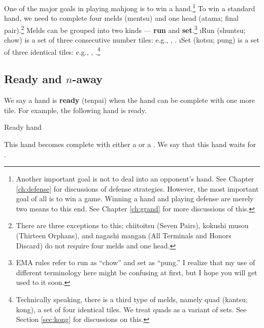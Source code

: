 One of the major goals in playing mahjong is to win a hand.\footnote{Another important goal is not to deal into an opponent's hand. See Chapter \ref{ch:defense} for discussions of defense strategies. However, the most important goal of all is to win a game. Winning a hand and playing defense are merely two means to this end. See Chapter \ref{ch:grand} for more discussions of this.}
To win a standard hand, we need to complete four melds ({\jap mentsu}) and one head ({\jap atama}; final pair).\footnote{There are three exceptions to this; {\jap chiitoitsu} (Seven Pairs), {\jap kokushi musou} (Thirteen Orphans), and {\jap nagashi mangan} (All Terminals and Honors Discard) do not require four melds and one head.} 
Melds can be grouped into two kinds --- {\bf run} and {\bf set}.\footnote{EMA rules refer to run as ``chow'' and set as ``pung.'' I realize that my use of different terminology here might be confusing at first, but I hope you will get used to it soon.}
\bi
\i Run ({\jap shuntsu}; chow) is a set of three consecutive number tiles: e.g., {\large {}}, {\large {}}. 
\i Set ({\jap kotsu}; pung) is a set of three identical tiles: e.g., {\large {}}, {\large \fa\fa\fa}.\footnote{Technically speaking, there is a third type of melds, namely quad ({\jap kantsu}; kong), a set of four identical tiles. We treat quads as a variant of sets. See Section \ref{sec:kong} for discussions on this.} 
\ei
 

\subsection{Ready and $n$-away}
	 
We say a hand is {\bf ready} ({\jap tenpai}) when the hand can be complete with one more tile. For example, the following hand is ready. 
\bigskip
\begin{itembox}[r]{Ready hand}
\bp
{}\zhong\zhong\zhong
\ep
\end{itembox}
This hand becomes complete with either a {\large{}} or a {\large{}}. We say that this hand waits for {\large{} }.

\bigskip

